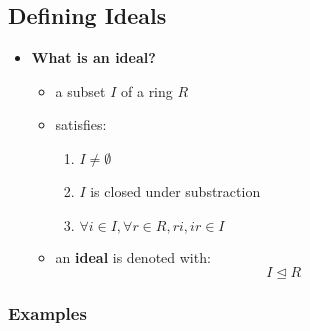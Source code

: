 \documentclass{exam}
\begin{document}
\subsection{Defining Ideals}

\begin{itemize}
    \item \textbf{What is an ideal?}
    \begin{itemize}
        \item a subset $I$ of a ring $R$
        \item satisfies:
        \begin{enumerate}
            \item $I \neq \emptyset$
            \item $I$ is closed under substraction
            \item $\forall i \in I, \forall r \in R, ri, ir \in I$
        \end{enumerate}
        \item an \textbf{ideal} is denoted with:
        \[
        I \trianglelefteq R
        \]
    \end{itemize}
    
\end{itemize}

\subsubsection{Examples}
\end{document}
